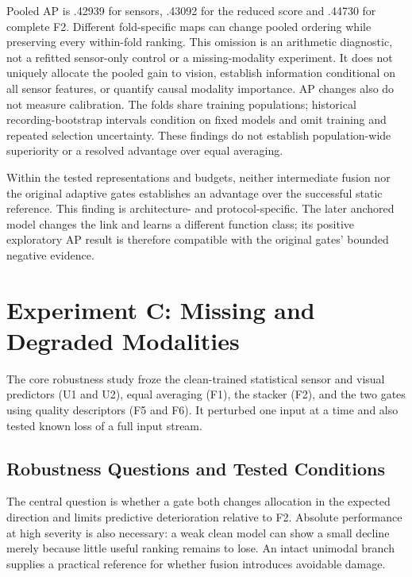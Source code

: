 Pooled AP is .42939 for sensors, .43092 for the reduced score and .44730 for complete
F2. Different fold-specific maps can change pooled ordering while preserving every
within-fold ranking. This omission is an arithmetic diagnostic, not a refitted
sensor-only control or a missing-modality experiment. It does not uniquely allocate the
pooled gain to vision, establish information conditional on all sensor features, or
quantify causal modality importance. AP changes also do not measure calibration. The
folds share training populations; historical recording-bootstrap intervals condition on
fixed models and omit training and repeated selection uncertainty. These findings do not
establish population-wide superiority or a resolved advantage over equal
averaging.

Within the tested representations and budgets, neither intermediate fusion nor the
original adaptive gates establishes an advantage over the successful static reference.
This finding is architecture- and protocol-specific. The later anchored model changes
the link and learns a different function class; its positive exploratory AP result is
therefore compatible with the original gates' bounded negative evidence.

\section{Experiment C: Missing and Degraded Modalities}
The core robustness study froze the clean-trained statistical sensor and visual
predictors (U1 and U2), equal averaging (F1), the stacker (F2), and the two gates using
quality descriptors (F5 and F6). It perturbed one input at a time and also tested known
loss of a full input stream.

\subsection{Robustness Questions and Tested Conditions}
The central question is whether a gate both changes allocation in the expected direction
and limits predictive deterioration relative to F2. Absolute performance at high
severity is also necessary: a weak clean model can show a small decline merely because
little useful ranking remains to lose. An intact unimodal branch supplies a practical
reference for whether fusion introduces avoidable damage.

